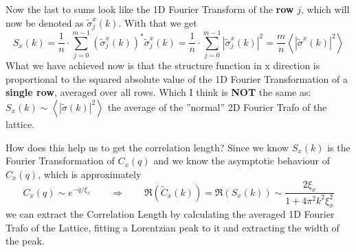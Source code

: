 	Now the last to sums look like the 1D Fourier Transform of the \textbf{row} $j$, which will now be denoted as $\tilde{\sigma}_j^x(k)$. With that we get
	\begin{equation}
		S_x(k) = \frac{1}{n} \cdot \sum_{j = 0}^{m-1} \left(\tilde{\sigma}_j^x(k)\right)^* \tilde{\sigma}_j^x(k)  =	\frac{1}{n} \cdot \sum_{j = 0}^{m-1} |\tilde{\sigma}_j^x(k)|^2 =	\frac{m}{n} \left\langle |\tilde{\sigma}^x(k)|^2 \right\rangle
	\end{equation}
	What we have achieved now is that the structure function in x direction is proportional to the  squared absolute value of the 1D Fourier Transformation of a \textbf{single row}, averaged over all rows. Which I think is \textbf{NOT} the same as: $S_x(k) \sim \left\langle |\tilde{\sigma}(k)|^2 \right\rangle$ the average of the ''normal'' 2D Fourier Trafo of the lattice.
	
	How does this help us to get the correlation length? Since we know $S_x(k)$ is the Fourier Transformation of $C_x(q)$ and we know the asymptotic behaviour of $C_x(q)$, which is approximately
	\begin{equation}
		C_x(q) \sim e^{-q /	\xi_x} \qquad \Rightarrow \qquad \Re\left(\tilde{C}_x(k)\right) = \Re \left(S_x(k) \right) \sim \frac{2 \xi_x}{1 + 4 \pi^2 k^2 \xi_x^2}
	\end{equation}
	we can extract the Correlation Length by calculating the averaged 1D Fourier Trafo of the Lattice, fitting a Lorentzian peak to it and extracting the width of the peak.
	
